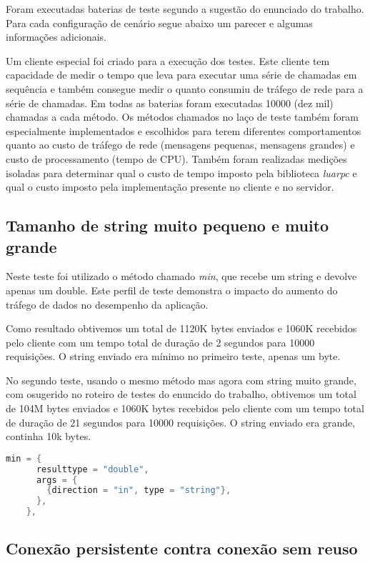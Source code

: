 \documentclass[11pt]{article}
\begin{document}
Foram executadas baterias de teste segundo a sugestão do enunciado do trabalho.
Para cada configuração de cenário segue abaixo um parecer e algumas informações
adicionais.

Um cliente especial foi criado para a execução dos testes. Este cliente tem
capacidade de medir o tempo que leva para executar uma série de chamadas em
sequência e também consegue medir o quanto consumiu de tráfego de rede para a
série de chamadas. Em todas as baterias foram executadas 10000 (dez mil)
chamadas a cada método. Os métodos chamados no laço de teste também foram
especialmente implementados e escolhidos para terem diferentes comportamentos
quanto ao custo de tráfego de rede (mensagens pequenas, mensagens grandes) e
custo de processamento (tempo de CPU). Também foram realizadas medições isoladas
para determinar qual o custo de tempo imposto pela biblioteca \textit{luarpc} e
qual o custo imposto pela implementação presente no cliente e no servidor.

\subsection{Tamanho de string muito pequeno e muito grande}\label{subsec:stringsize}

Neste teste foi utilizado o método chamado \textit{min}, que recebe um string e
devolve apenas um double. Este perfil de teste demonstra o impacto do aumento
do tráfego de dados no desempenho da aplicação.

Como resultado obtivemos um total de 1120K bytes enviados e 1060K recebidos pelo
cliente com um tempo total de duração de 2 segundos para 10000 requisições. O
string enviado era mínimo no primeiro teste, apenas um byte.

No segundo teste, usando o mesmo método mas agora com string muito grande, com
osugerido no roteiro de testes do enuncido do trabalho, obtivemos um total de
104M bytes enviados e 1060K bytes recebidos pelo cliente com um tempo total de
duração de 21 segundos para 10000 requisições. O string enviado era grande,
continha 10k bytes.

\begin{lstlisting}[label={ifacemin},language=C,caption=Interface min]
    min = {
      resulttype = "double",
      args = {
        {direction = "in", type = "string"},
      },
    },
\end{lstlisting}

\subsection{Conexão persistente contra conexão sem reuso}\label{subsec:persist}
\end{document}
